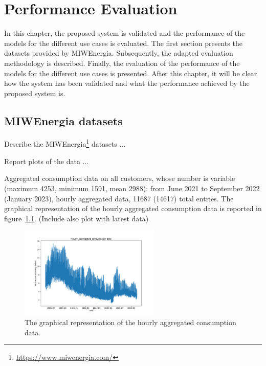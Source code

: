 \chapter{Performance Evaluation}
\label{cha:evaluation}
\vspace{0.4 cm}

In this chapter, the proposed system is validated and the performance of the models for the different use cases is evaluated.
The first section presents the datasets provided by MIWEnergia.
Subsequently, the adapted evaluation methodology is described.
Finally, the evaluation of the performance of the models for the different use cases is presented.
After this chapter, it will be clear how the system has been validated and what the performance achieved by the proposed system is.


\section{MIWEnergia datasets}
\label{sec:datasets}
\vspace{0.2 cm}

Describe the MIWEnergia\footnote{ \url{https://www.miwenergia.com/} } datasets ...

Report plots of the data ...

Aggregated consumption data on all customers, whose number is variable (maximum 4253, minimum 1591, mean 2988): from June 2021 to September 2022 (January 2023), hourly aggregated data, 11687 (14617) total entries.
The graphical representation of the hourly aggregated consumption data is reported in figure~\ref{fig:demanddataplot}. (Include also plot with latest data)

\begin{figure}[H]
\centering
\includegraphics[width=0.6\textwidth]{images/demand/data_plot}
\caption{The graphical representation of the hourly aggregated consumption data.}
\label{fig:demanddataplot}
\end{figure}


